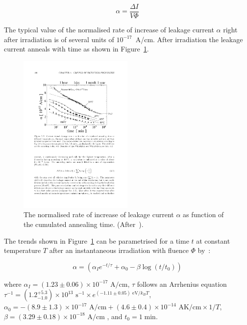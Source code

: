 \begin{equation}
\alpha = \dfrac{\Delta I}{V\Phi}
\label{eq:alpha}
\end{equation}
 
 The typical value of the normalised rate of increase of leakage current $\alpha$ right after irradiation is of several units of $10^{-17}$~A/cm. After 
 irradiation the leakage current anneals with time as shown in Figure~\ref{fig:alpha_annealing}.
 
 \begin{figure}[!htbp]
 \centering
 \includegraphics[width=0.5\textwidth]{alpha_annealing.pdf}
 \caption{\label{fig:alpha_annealing}The normalised rate of increase of leakage current $\alpha$ as 
 function of the cumulated annealing time. (After~\cite{moll-thesis}).}
 \end{figure}
 The trends shown in Figure~\ref{fig:alpha_annealing} can be parametrised for a time $t$ at constant 
 temperature $T$ after an instantaneous irradiation with fluence $\Phi$ by~\cite{moll-thesis}:
 
 \begin{equation}
\alpha = \left(\alpha_Ie^{-t/\tau}+\alpha_0-\beta\log(t/t_0)\right)
\label{eq:alpha_annealing}
\end{equation}
 
 \noindent  where $\alpha_I=(1.23\pm0.06)\times 10^{-17}\text{ A}/\text{cm}$, $\tau$ follows an Arrhenius equation $\tau^{-1}=(1.2^{+5.3}_{-1.0})\times 10^{13}\text{ s}^{-1}\times e^{(-1.11\pm 0.05)\text{ eV}/k_BT}$, $\alpha_0=-(8.9\pm1.3)\times 10^{-17}\text{ A}/\text{cm}+(4.6\pm0.4)\times10^{-14}\text{ AK}/\text{cm}\times 1/T$, $\beta=(3.29\pm 0.18)\times 10^{-18}\text{ A}/\text{cm}$ , and $t_0=1\;$min.
 
